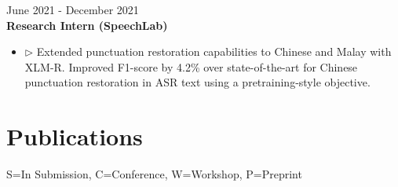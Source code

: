 \documentclass[11pt,letterpaper]{article}
\begin{document}
\begin{itemize}[leftmargin=*,label={},itemsep=4pt]
        \hfill June 2021 - December 2021\\
        \textbf{\textit{} Research Intern (SpeechLab)}\\
        \begin{itemize}
        \item $\triangleright$ Extended punctuation restoration capabilities to Chinese and Malay with XLM-R. Improved F1-score by 4.2\% over state-of-the-art for Chinese punctuation restoration in ASR text using a pretraining-style objective.\\
        \end{itemize}
\end{itemize}

\section*{Publications}
\small{S=In Submission, C=Conference, W=Workshop, P=Preprint}
\end{document}
